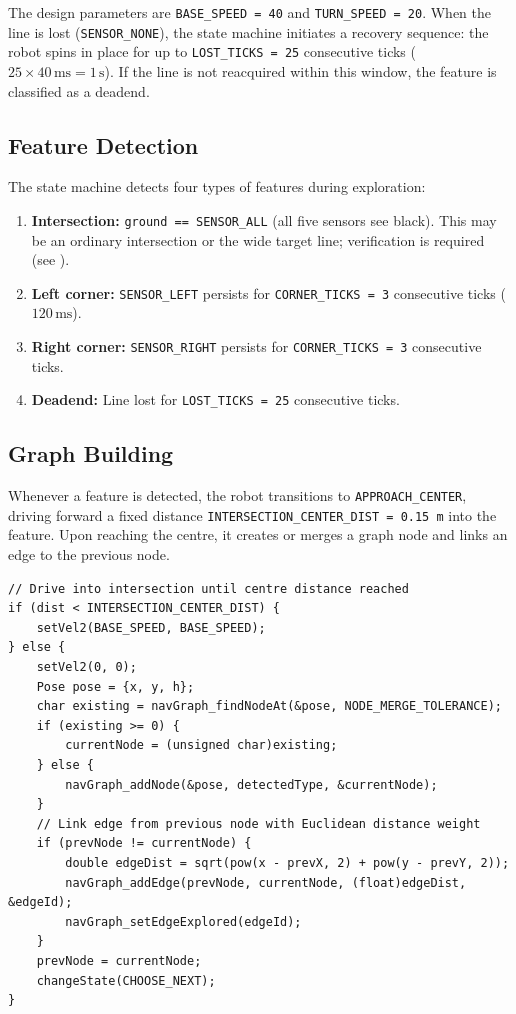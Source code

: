 \documentclass[runningheads]{llncs}
\begin{document}
The design parameters are \texttt{BASE\_SPEED = 40} and \texttt{TURN\_SPEED = 20}. When the line is lost (\texttt{SENSOR\_NONE}), the state machine initiates a recovery sequence: the robot spins in place for up to \texttt{LOST\_TICKS = 25} consecutive ticks ($25 \times 40\,\text{ms} = 1\,\text{s}$). If the line is not reacquired within this window, the feature is classified as a deadend.

\subsection{Feature Detection}

The state machine detects four types of features during exploration:

\begin{enumerate}
    \item \textbf{Intersection:} \texttt{ground == SENSOR\_ALL} (all five sensors see black). This may be an ordinary intersection or the wide target line; verification is required (see ).
    \item \textbf{Left corner:} \texttt{SENSOR\_LEFT} persists for \texttt{CORNER\_TICKS = 3} consecutive ticks ($120\,\text{ms}$).
    \item \textbf{Right corner:} \texttt{SENSOR\_RIGHT} persists for \texttt{CORNER\_TICKS = 3} consecutive ticks.
    \item \textbf{Deadend:} Line lost for \texttt{LOST\_TICKS = 25} consecutive ticks.
\end{enumerate}

\subsection{Graph Building}

Whenever a feature is detected, the robot transitions to \texttt{APPROACH\_CENTER}, driving forward a fixed distance \texttt{INTERSECTION\_CENTER\_DIST = 0.15\,m} into the feature. Upon reaching the centre, it creates or merges a graph node and links an edge to the previous node.

\begin{lstlisting}[caption={Graph building procedure in \texttt{APPROACH\_CENTER}.},label={lst:graphbuild}]
// Drive into intersection until centre distance reached
if (dist < INTERSECTION_CENTER_DIST) {
    setVel2(BASE_SPEED, BASE_SPEED);
} else {
    setVel2(0, 0);
    Pose pose = {x, y, h};
    char existing = navGraph_findNodeAt(&pose, NODE_MERGE_TOLERANCE);
    if (existing >= 0) {
        currentNode = (unsigned char)existing;
    } else {
        navGraph_addNode(&pose, detectedType, &currentNode);
    }
    // Link edge from previous node with Euclidean distance weight
    if (prevNode != currentNode) {
        double edgeDist = sqrt(pow(x - prevX, 2) + pow(y - prevY, 2));
        navGraph_addEdge(prevNode, currentNode, (float)edgeDist, &edgeId);
        navGraph_setEdgeExplored(edgeId);
    }
    prevNode = currentNode;
    changeState(CHOOSE_NEXT);
}
\end{lstlisting}
\end{document}
